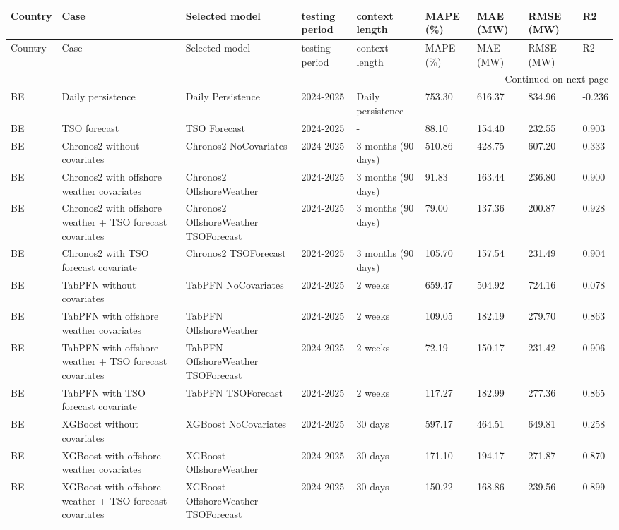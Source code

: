 \begin{longtable}{lllllllll}
\toprule
Country & Case & Selected model & testing period & context length & MAPE (\%) & MAE (MW) & RMSE (MW) & R2 \\
\midrule
\endfirsthead
\toprule
Country & Case & Selected model & testing period & context length & MAPE (\%) & MAE (MW) & RMSE (MW) & R2 \\
\midrule
\endhead
\midrule
\multicolumn{9}{r}{Continued on next page} \\
\midrule
\endfoot
\bottomrule
\endlastfoot
BE & Daily persistence & Daily Persistence & 2024-2025 & Daily persistence & 753.30 & 616.37 & 834.96 & -0.236 \\
BE & TSO forecast & TSO Forecast & 2024-2025 & - & 88.10 & 154.40 & 232.55 & 0.903 \\
BE & Chronos2 without covariates & Chronos2 NoCovariates & 2024-2025 & 3 months (90 days) & 510.86 & 428.75 & 607.20 & 0.333 \\
BE & Chronos2 with offshore weather covariates & Chronos2 OffshoreWeather & 2024-2025 & 3 months (90 days) & 91.83 & 163.44 & 236.80 & 0.900 \\
BE & Chronos2 with offshore weather + TSO forecast covariates & Chronos2 OffshoreWeather TSOForecast & 2024-2025 & 3 months (90 days) & 79.00 & 137.36 & 200.87 & 0.928 \\
BE & Chronos2 with TSO forecast covariate & Chronos2 TSOForecast & 2024-2025 & 3 months (90 days) & 105.70 & 157.54 & 231.49 & 0.904 \\
BE & TabPFN without covariates & TabPFN NoCovariates & 2024-2025 & 2 weeks & 659.47 & 504.92 & 724.16 & 0.078 \\
BE & TabPFN with offshore weather covariates & TabPFN OffshoreWeather & 2024-2025 & 2 weeks & 109.05 & 182.19 & 279.70 & 0.863 \\
BE & TabPFN with offshore weather + TSO forecast covariates & TabPFN OffshoreWeather TSOForecast & 2024-2025 & 2 weeks & 72.19 & 150.17 & 231.42 & 0.906 \\
BE & TabPFN with TSO forecast covariate & TabPFN TSOForecast & 2024-2025 & 2 weeks & 117.27 & 182.99 & 277.36 & 0.865 \\
BE & XGBoost without covariates & XGBoost NoCovariates & 2024-2025 & 30 days & 597.17 & 464.51 & 649.81 & 0.258 \\
BE & XGBoost with offshore weather covariates & XGBoost OffshoreWeather & 2024-2025 & 30 days & 171.10 & 194.17 & 271.87 & 0.870 \\
BE & XGBoost with offshore weather + TSO forecast covariates & XGBoost OffshoreWeather TSOForecast & 2024-2025 & 30 days & 150.22 & 168.86 & 239.56 & 0.899 \\

\end{longtable}
